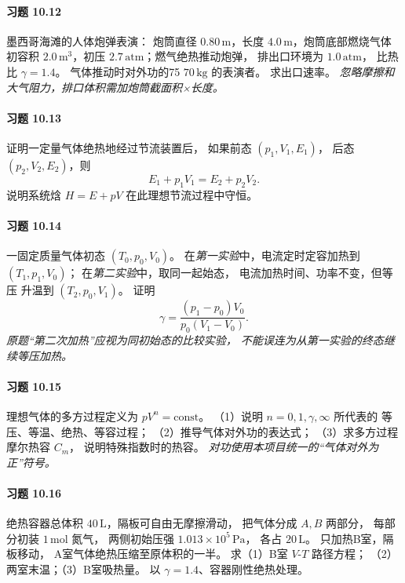 \paragraph{习题 10.12}
墨西哥海滩的人体炮弹表演：
炮筒直径 \(0.80\,\mathrm m\)，长度
\(4.0\,\mathrm m\)，炮筒底部燃烧气体
初容积 \(2.0\,\mathrm{m^3}\)，初压
\(2.7\,\mathrm{atm}\)；燃气绝热推动炮弹，
排出口环境为 \(1.0\,\mathrm{atm}\)，
比热比 \(\gamma=1.4\)。
气体推动时对外功的75%
\(70\,\mathrm{kg}\) 的表演者。
求出口速率。
\textit{忽略摩擦和大气阻力，排口体积需加炮筒截面积×长度。}

\paragraph{习题 10.13}
证明一定量气体绝热地经过节流装置后，
如果前态 \((p_1,V_1,E_1)\)，
后态 \((p_2,V_2,E_2)\)，则
\[
 E_1+p_1V_1=E_2+p_2V_2.
\]
说明系统焓 \(H=E+pV\)
在此理想节流过程中守恒。

\paragraph{习题 10.14}
一固定质量气体初态 \((T_0,p_0,V_0)\)。
在\emph{第一实验}中，电流定时定容加热到
\((T_1,p_1,V_0)\)；
在\emph{第二实验}中，取同一起始态，
电流加热时间、功率不变，但等压
升温到 \((T_2,p_0,V_1)\)。
证明
\[
 \gamma=\frac{(p_1-p_0)V_0}
 {p_0(V_1-V_0)}.
\]
\textit{原题“第二次加热”应视为同初始态的比较实验，
不能误连为从第一实验的终态继续等压加热。}

\paragraph{习题 10.15}
理想气体的多方过程定义为 \(pV^n=\mathrm{const}\)。
（1）说明 \(n=0,1,\gamma,\infty\) 所代表的
等压、等温、绝热、等容过程；
（2）推导气体对外功的表达式；
（3）求多方过程摩尔热容 \(C_m\)，
说明特殊指数时的热容。
\textit{对功使用本项目统一的“气体对外为正”符号。}

\paragraph{习题 10.16}
绝热容器总体积
\(40\,\mathrm L\)，隔板可自由无摩擦滑动，
把气体分成 \(A,B\) 两部分，
每部分初装 \(1\,\mathrm{mol}\) 氮气，
两侧初始压强
\(1.013\times10^5\,\mathrm{Pa}\)，
各占 \(20\,\mathrm L\)。
只加热B室，隔板移动，
A室气体绝热压缩至原体积的一半。
求（1）B室 \(V\)-\(T\) 路径方程；
（2）两室末温；（3）B室吸热量。
以 \(\gamma=1.4\)、容器刚性绝热处理。


